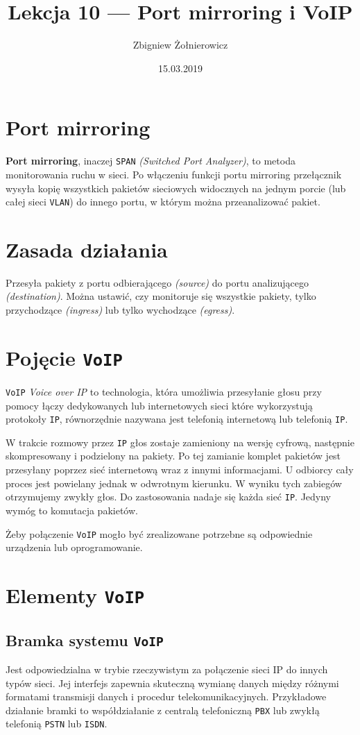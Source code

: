 \documentclass{article}
\begin{document}
\title{Lekcja 10 --- Port mirroring i VoIP}
\author{Zbigniew Żołnierowicz}
\date{15.03.2019}
\maketitle
\section{Port mirroring}
\textbf{Port mirroring}, inaczej {\tt SPAN} \emph{(Switched Port Analyzer)},
to metoda monitorowania ruchu w sieci. Po włączeniu funkcji portu mirroring
przełącznik wysyła kopię wszystkich pakietów sieciowych widocznych na jednym porcie
(lub całej sieci {\tt VLAN}) do innego portu, w którym można przeanalizować pakiet.
\section{Zasada działania}
Przesyła pakiety z portu odbierającego \emph{(source)} do portu analizującego
\emph{(destination)}. Można ustawić, czy monitoruje się
wszystkie pakiety, tylko przychodzące \emph{(ingress)} lub
tylko wychodzące \emph{(egress)}.
\section{Pojęcie {\tt VoIP}}
{\tt VoIP} \emph{Voice over IP} to technologia, która umożliwia przesyłanie głosu przy pomocy
łączy dedykowanych lub internetowych sieci które wykorzystują protokoły {\tt IP},
równorzędnie nazywana jest telefonią internetową lub telefonią {\tt IP}.

W trakcie rozmowy przez {\tt IP} głos zostaje zamieniony na wersję cyfrową,
następnie skompresowany i podzielony na pakiety. Po tej zamianie komplet
pakietów jest przesyłany poprzez sieć internetową wraz z innymi informacjami.
U odbiorcy cały proces jest powielany jednak w odwrotnym kierunku. W wyniku
tych zabiegów otrzymujemy zwykły głos. Do zastosowania nadaje się każda sieć {\tt IP}.
Jedyny wymóg to komutacja pakietów.

Żeby połączenie {\tt VoIP} mogło być zrealizowane potrzebne są odpowiednie
urządzenia lub oprogramowanie.
\pagebreak
\section{Elementy {\tt VoIP}}
\subsection{Bramka systemu {\tt VoIP}}
Jest odpowiedzialna w trybie rzeczywistym za połączenie sieci IP do innych typów sieci.
Jej interfejs zapewnia skuteczną wymianę danych między różnymi formatami
transmisji danych i procedur telekomunikacyjnych. Przykładowe działanie bramki
to współdziałanie z centralą telefoniczną {\tt PBX}
lub zwykłą telefonią {\tt PSTN} lub {\tt ISDN}.
\end{document}
